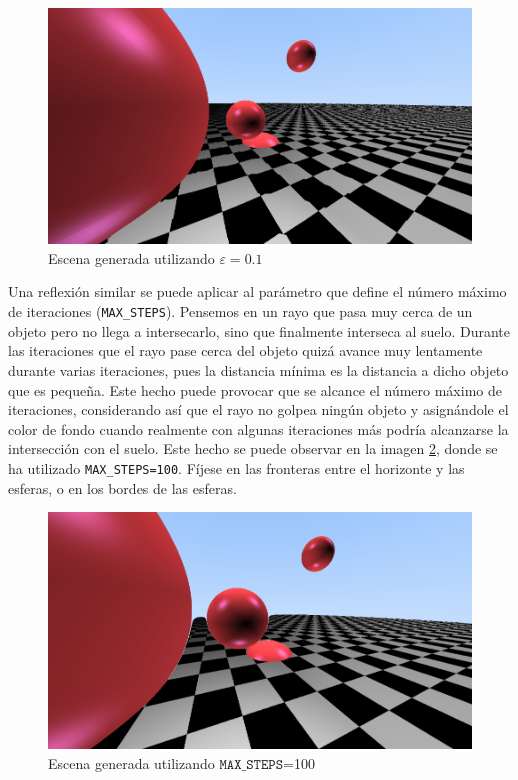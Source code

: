 \begin{figure} [ht]
    \centering
    \includegraphics[scale = 0.3]{img/C8/epsilon-grande.png}
    \caption{Escena generada utilizando $\varepsilon=0.1$}
    \label{fig:epsilon-grande}
\end{figure}

Una reflexión similar se puede aplicar al parámetro que define el número máximo de iteraciones (\verb|MAX_STEPS|). Pensemos en un rayo que pasa muy cerca de un objeto pero no llega a intersecarlo, sino que finalmente interseca al suelo. Durante las iteraciones que el rayo pase cerca del objeto quizá avance muy lentamente durante varias iteraciones, pues la distancia mínima es la distancia a dicho objeto que es pequeña. Este hecho puede provocar que se alcance el número máximo de iteraciones, considerando así que el rayo no golpea ningún objeto y asignándole el color de fondo cuando realmente con algunas iteraciones más podría alcanzarse la intersección con el suelo. Este hecho se puede observar en la imagen \ref{fig:pocas-iteraciones}, donde se ha utilizado \verb|MAX_STEPS=100|. Fíjese en las fronteras entre el horizonte y las esferas, o en los bordes de las esferas.

\begin{figure} [ht]
    \centering
    \includegraphics[scale = 0.3]{img/C8/pocas-iteraciones.png}
    \caption{Escena generada utilizando $\mathtt{MAX\_STEPS}$=100}
    \label{fig:pocas-iteraciones}
\end{figure}

